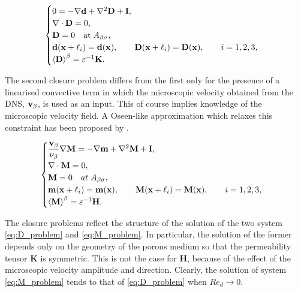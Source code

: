 \begin{eqnarray*}
\begin{cases}
0 = -\nabla \mathbf{d} + \nabla^2 \mathbf{D} +\mathbf{I},\\
\nabla \cdot \mathbf{D} = 0,  \\
\mathbf{D} = 0 \quad \textrm{at} \; A_{\beta \sigma}, \\
\mathbf{d}(\mathbf{x} +\ell_i) = \mathbf{d}(\mathbf{x}), \qquad \mathbf{D}(\mathbf{x} +\ell_i) = \mathbf{D}(\mathbf{x}), \qquad i=1,2,3 , \\
{\left< \mathbf{D} \right>}^{\beta} = \varepsilon^{-1} \mathbf{K}.
\end{cases}
\end{eqnarray*}

The second closure problem differs from the first only for the presence of a linearised convective term 
in which the microscopic velocity obtained from the DNS, $\textbf{v}_{\beta}$, is used as an input.  This of course implies knowledge of the microscopic velocity field. A Oseen-like approximation which relaxes this constraint has been proposed by \citet{zampogna2016fluid}.

\begin{eqnarray*}
\begin{cases}
\dfrac{\textbf{v}_{\beta}}{\nu_{\beta}} \nabla \mathbf{M} = -\nabla \mathbf{m} + \nabla^2 \mathbf{M} +\mathbf{I},\\
\nabla \cdot \mathbf{M} = 0,  \\
\mathbf{M} = 0 \quad at \; A_{\beta \sigma}, \\
\mathbf{m}(\mathbf{x} +\ell_i) = \mathbf{m}(\mathbf{x}), \qquad \mathbf{M}(\mathbf{x} +\ell_i) = \mathbf{M}(\mathbf{x}), \qquad i=1,2,3 ,\\
{\left< \mathbf{M} \right>}^{\beta} = \varepsilon^{-1} \mathbf{H}.
\end{cases}
\label{eq:h_model}
\end{eqnarray*}


The closure problems reflect the structure of the solution of the two system \eqref{eq:D_problem} and \eqref{eq:M_problem}. In particular, the solution of the former depends only on the geometry of the porous medium so that the permeability tensor $\mathbf{K}$ is symmetric. This is not the case for $\mathbf{H}$, because of the effect of the microscopic velocity amplitude and direction.  Clearly, the solution of system \eqref{eq:M_problem} tends to that of \eqref{eq:D_problem} when $Re_d \rightarrow 0$. 



